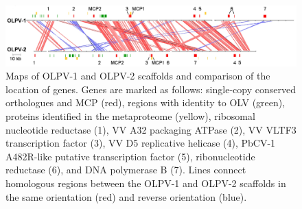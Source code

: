 \begin{figure}
\includegraphics[width=\textwidth]{olv_figures/OLPV_genome.jpg}
\caption[Maps of \ac{OLPV} genomic scaffolds]{Maps of \ac{OLPV}-1 and \ac{OLPV}-2 scaffolds and comparison of the location of genes. Genes are marked as follows: single-copy conserved orthologues and \ac{MCP} (red), regions with identity to \ac{OLV} (green), proteins identified in the metaproteome (yellow), ribosomal nucleotide reductase \textbeta{} (1), VV A32 packaging ATPase (2), VV VLTF3 transcription factor (3), VV D5 replicative helicase (4), PbCV-1 A482R-like putative transcription factor (5), ribonucleotide reductase \textalpha{} (6), and \textsc{DNA} polymerase B (7). Lines connect homologous regions between the \ac{OLPV}-1 and \ac{OLPV}-2 scaffolds in the same orientation (red) and reverse orientation (blue).
}
\label{fig:OLPV_genome}

\end{figure}
